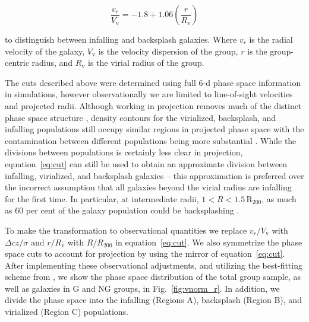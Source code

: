 \documentclass[a4paper,fleqn,usenatbib]{mnras}
\begin{document}
\begin{equation} \label{eq:cut}
  \frac{v_r}{V_\mathrm{v}} = -1.8 + 1.06
  \left(\frac{r}{R_\mathrm{v}}\right)
\end{equation}

\noindent
to distinguish between infalling and backsplash galaxies.  Where $v_r$
is the radial velocity of the galaxy, $V_\mathrm{v}$ is the velocity
dispersion of the group, $r$ is the group-centric radius, and
$R_\mathrm{v}$ is the virial radius of the group.
\par
The cuts described above were determined using full 6-d phase space
information in simulations, however observationally we are limited to
line-of-sight
velocities and projected radii.  Although working in projection
removes much of the distinct phase space structure \citep{oman2013, haines2015},
density contours for the virialized, backsplash, and infalling
populations still occupy similar regions in projected phase space
with the contamination between different populations being more substantial
\citep{mahajan2011}.  While the divisions between populations is
certainly less clear in projection, equation~\ref{eq:cut} can still be
used to obtain an approximate division between infalling, virialized,
and backsplash galaxies -- this approximation is preferred over
the incorrect assumption that all galaxies beyond the virial radius
are infalling for the first time.  In particular, at intermediate
radii, $1 < R < 1.5\,\mathrm{R_{200}}$, as much as 60 per cent of the
galaxy population could be backsplashing \citep{mahajan2011, hou2014}.
\par
To make the transformation to observational quantities we replace
$v_r/V_\mathrm{v}$ with $\Delta cz/\sigma$ and $r/R_\mathrm{v}$ with
$R/R_{200}$ in equation~\ref{eq:cut}.  We also symmetrize the phase
space cuts to account for projection by using the mirror of
equation~\ref{eq:cut}.  After implementing these observational
adjustments, and utilizing the best-fitting scheme from
\citet{mahajan2011}, we show the phase space distribution of the total
group sample, as well as galaxies in G and NG groups, in
Fig.~\ref{fig:vnorm_r}.  In addition, we divide the phase space into
the infalling (Regions A), backsplash (Region B), and 
virialized (Region C) populations. 

\end{document}
